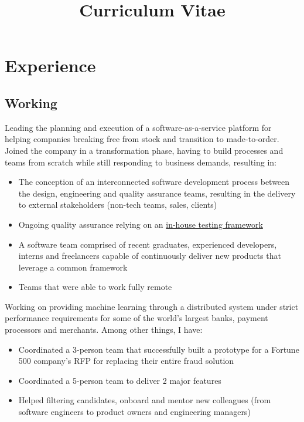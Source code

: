 \documentclass[11pt,a4paper]{moderncv}
\title{Curriculum Vitae}
\begin{document}
\maketitle

\vspace{-10mm}

\section{Experience}
\vspace{-2mm}
\subsection{Working}
{Leading the planning and execution of a software-as-a-service platform for helping companies breaking free from stock and transition to made-to-order. Joined the company in a transformation phase, having to build processes and teams from scratch while still responding to business demands, resulting in:
\begin{itemize}
  \item The conception of an interconnected software development process between the design, engineering and quality assurance teams, resulting in the delivery to external stakeholders (non-tech teams, sales, clients)
  \item Ongoing quality assurance relying on an \href{https://github.com/ripe-tech/ripe-rainbow/}{in-house testing framework}
  \item A software team comprised of recent graduates, experienced developers, interns and freelancers capable of continuously deliver new products that leverage a common framework
  \item Teams that were able to work fully remote
\end{itemize}}
{Working on providing machine learning through a distributed system under strict performance requirements for some of the world's largest banks, payment processors and merchants.
Among other things, I have:
\begin{itemize}
  \item Coordinated a 3-person team that successfully built a prototype for a Fortune 500 company's RFP for replacing their entire fraud solution
  \item Coordinated a 5-person team to deliver 2 major features
  \item Helped filtering candidates, onboard and mentor new colleagues (from software engineers to product owners and engineering managers)
\end{itemize}}
\end{document}

